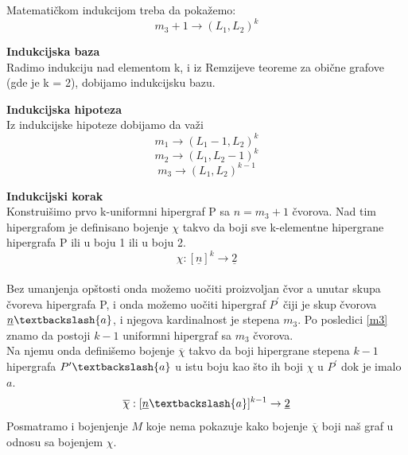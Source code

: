 \documentclass[a4paper]{article}
\begin{document}
	\noindent  
	Matematičkom indukcijom treba da pokažemo:
	\begin{equation}\label{OsnovnaRemzijeva}
		m_{3} + 1 \rightarrow (L_1, L_2)^k		
	\end{equation}
	\begin{description}
		\item \textbf{Indukcijska baza} \\
		Radimo indukciju nad elementom k, i iz Remzijeve teoreme za obične grafove (gde je k = 2), dobijamo indukcijsku bazu. 
		\item \textbf{Indukcijska hipoteza}\\
		Iz indukcijske hipoteze dobijamo da važi
		\begin{equation}\label{m1}
		m_{1} \rightarrow (L_1 - 1, L_2)^k		
		\end{equation}
		\begin{equation}\label{m2}
		m_{2} \rightarrow (L_1, L_2 -1)^k		
		\end{equation}
		\begin{equation}\label{m3}
		m_{3} \rightarrow (L_1, L_2)^{k-1}		
		\end{equation}
		\item \textbf{Indukcijski korak}\\	
		Konstruišimo prvo k-uniformni hipergraf P sa $n = m_3 + 1$ čvorova. Nad tim hipergrafom je definisano bojenje $\chi$ takvo da boji sve k-elementne hipergrane hipergrafa P ili u boju 1 ili u boju 2.\begin{equation}
			\chi : [ \underline{n} ]^k  \rightarrow \underline{2}
		\end{equation} \\
		Bez umanjenja opštosti onda možemo uočiti proizvoljan čvor a unutar skupa čvoreva hipergrafa P, i onda možemo uočiti hipergraf $P^\prime$ čiji je skup čvorova $\underline{n} \textbackslash \{ a \}$, i njegova kardinalnost je stepena $m_3$. Po posledici \ref{m3} znamo da postoji $k-1$ uniformni hipergraf sa $m_3$ čvorova. %
		\\
		Na njemu onda definišemo bojenje $\overline{\chi}$ takvo da boji hipergrane stepena $k-1$ hipergrafa $P^\prime \textbackslash \{ a \}$ u istu boju kao što ih boji  $\chi$ u $P^\prime$ dok je imalo $a$.
		\begin{equation}
			\overline{\chi} : [ \underline{n} \textbackslash \{a\} ]^{k-1}  \rightarrow \underline{2}
		\end{equation} %
		Posmatramo i bojenjenje $M$ koje nema pokazuje kako bojenje $\overline{\chi}$ boji naš graf u odnosu sa bojenjem $\chi$.

\end{description}
\end{document}
